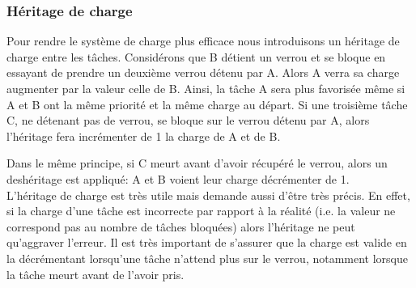 \subsubsection{Héritage de charge}

Pour rendre le système de charge plus efficace nous introduisons un héritage
de charge entre les tâches. Considérons que B détient un verrou et se bloque
en essayant de prendre un deuxième verrou détenu par A. Alors A verra sa
charge augmenter par la valeur celle de B. Ainsi, la tâche A sera plus favorisée même
si A et B ont la même priorité et la même charge au départ. Si une troisième tâche C,
ne détenant pas de verrou, se bloque sur le verrou détenu par A, alors l'héritage fera incrémenter
de 1 la charge de A et de B.

Dans le même principe, si C meurt avant d'avoir récupéré le verrou, alors un deshéritage est
appliqué: A et B voient leur charge décrémenter de 1.
\\

L'héritage de charge est très utile mais demande aussi d'être très précis.
En effet, si la charge d'une tâche est incorrecte par rapport à la réalité
(i.e. la valeur ne correspond pas au nombre de tâches bloquées)
alors l'héritage ne peut qu'aggraver l'erreur. Il est très important
de s'assurer que la charge est valide en la décrémentant lorsqu'une tâche 
n'attend plus sur le verrou, notamment lorsque la tâche meurt avant de l'avoir pris.
